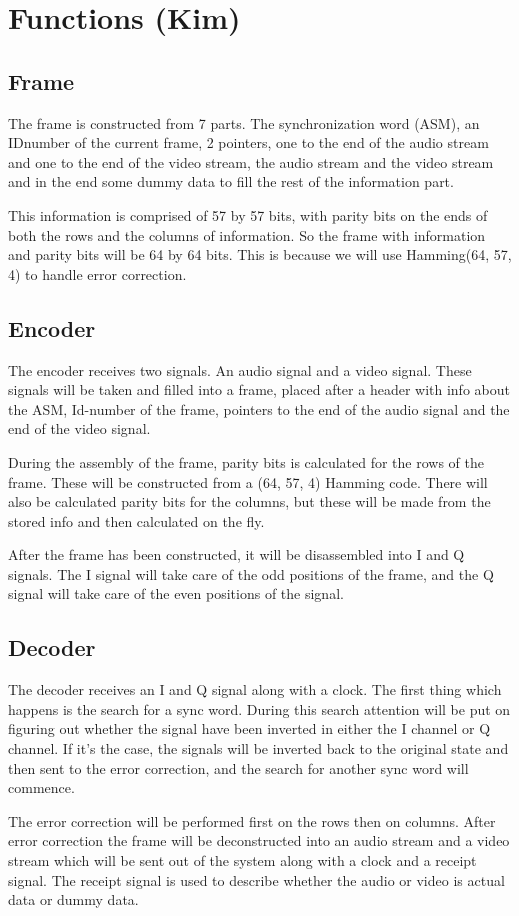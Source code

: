\section{Functions (Kim)}

\subsection{Frame}
The frame is constructed from 7 parts. The synchronization word (ASM), an IDnumber of the current frame, 2 pointers, one to the end of the audio stream and one to the end of the video stream, the audio stream and the video stream and in the end some dummy data to fill the rest of the information part. 

This information is comprised of 57 by 57 bits, with parity bits on the ends of both the rows and the columns of information. So the frame with information and parity bits will be 64 by 64 bits. This is because we will use Hamming(64, 57, 4) to handle error correction.

\subsection{Encoder}
The encoder receives two signals. An audio signal and a video signal. These signals will be taken and filled into a frame, placed after a header with info about the ASM, Id-number of the frame, pointers to the end of the audio signal and the end of the video signal.

During the assembly of the frame, parity bits is calculated for the rows of the frame. These will be constructed from a (64, 57, 4) Hamming code. There will also be calculated parity bits for the columns, but these will be made from the stored info and then calculated on the fly.

After the frame has been constructed, it will be disassembled into I and Q signals. The I signal will take care of the odd positions of the frame, and the Q signal will take care of the even positions of the signal.

\subsection{Decoder}
The decoder receives an I and Q signal along with a clock. The first thing which happens is the search for a sync word. During this search attention will be put on figuring out whether the signal have been inverted in either the I channel or Q channel. If it’s the case, the signals will be inverted back to the original state and then sent to the error correction, and the search for another sync word will commence. 

The error correction will be performed first on the rows then on columns. After error correction the frame will be deconstructed into an audio stream and a video stream which will be sent out of the system along with a clock and a receipt signal. The receipt signal is used to describe whether the audio or video is actual data or dummy data.
